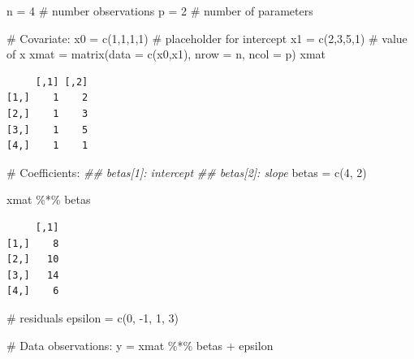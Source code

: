 \documentclass[
  letterpaper,
  DIV=11,
  numbers=noendperiod]{scrreprt}
\newenvironment{Shaded}{\begin{snugshade}}{\end{snugshade}}
\newcommand{\AttributeTok}[1]{\textcolor[rgb]{0.40,0.45,0.13}{#1}}
\newcommand{\CommentTok}[1]{\textcolor[rgb]{0.37,0.37,0.37}{#1}}
\newcommand{\DecValTok}[1]{\textcolor[rgb]{0.68,0.00,0.00}{#1}}
\newcommand{\DocumentationTok}[1]{\textcolor[rgb]{0.37,0.37,0.37}{\textit{#1}}}
\newcommand{\FunctionTok}[1]{\textcolor[rgb]{0.28,0.35,0.67}{#1}}
\newcommand{\NormalTok}[1]{\textcolor[rgb]{0.00,0.23,0.31}{#1}}
\newcommand{\OtherTok}[1]{\textcolor[rgb]{0.00,0.23,0.31}{#1}}
\newcommand{\SpecialCharTok}[1]{\textcolor[rgb]{0.37,0.37,0.37}{#1}}
\begin{document}
\begin{Shaded}
\begin{Highlighting}[]
\NormalTok{n }\OtherTok{=} \DecValTok{4} \CommentTok{\# number observations}
\NormalTok{p }\OtherTok{=} \DecValTok{2} \CommentTok{\# number of parameters}

\CommentTok{\# Covariate:}
\NormalTok{x0 }\OtherTok{=} \FunctionTok{c}\NormalTok{(}\DecValTok{1}\NormalTok{,}\DecValTok{1}\NormalTok{,}\DecValTok{1}\NormalTok{,}\DecValTok{1}\NormalTok{) }\CommentTok{\# placeholder for intercept}
\NormalTok{x1 }\OtherTok{=} \FunctionTok{c}\NormalTok{(}\DecValTok{2}\NormalTok{,}\DecValTok{3}\NormalTok{,}\DecValTok{5}\NormalTok{,}\DecValTok{1}\NormalTok{) }\CommentTok{\# value of x}
\NormalTok{xmat }\OtherTok{=} \FunctionTok{matrix}\NormalTok{(}\AttributeTok{data =} \FunctionTok{c}\NormalTok{(x0,x1), }
               \AttributeTok{nrow =}\NormalTok{ n, }
               \AttributeTok{ncol =}\NormalTok{ p)}
\NormalTok{xmat}
\end{Highlighting}
\end{Shaded}

\begin{verbatim}
     [,1] [,2]
[1,]    1    2
[2,]    1    3
[3,]    1    5
[4,]    1    1
\end{verbatim}

\begin{Shaded}
\begin{Highlighting}[]
\CommentTok{\# Coefficients:}
\DocumentationTok{\#\# betas[1]: intercept}
\DocumentationTok{\#\# betas[2]: slope}
\NormalTok{betas }\OtherTok{=} \FunctionTok{c}\NormalTok{(}\DecValTok{4}\NormalTok{, }\DecValTok{2}\NormalTok{)}

\NormalTok{xmat }\SpecialCharTok{\%*\%}\NormalTok{ betas}
\end{Highlighting}
\end{Shaded}

\begin{verbatim}
     [,1]
[1,]    8
[2,]   10
[3,]   14
[4,]    6
\end{verbatim}

\begin{Shaded}
\begin{Highlighting}[]
\CommentTok{\# residuals}
\NormalTok{epsilon }\OtherTok{=} \FunctionTok{c}\NormalTok{(}\DecValTok{0}\NormalTok{, }\SpecialCharTok{{-}}\DecValTok{1}\NormalTok{, }\DecValTok{1}\NormalTok{, }\DecValTok{3}\NormalTok{)}

\CommentTok{\# Data observations:}
\NormalTok{y }\OtherTok{=}\NormalTok{ xmat }\SpecialCharTok{\%*\%}\NormalTok{ betas }\SpecialCharTok{+}\NormalTok{ epsilon}
\end{Highlighting}
\end{Shaded}
\end{document}
